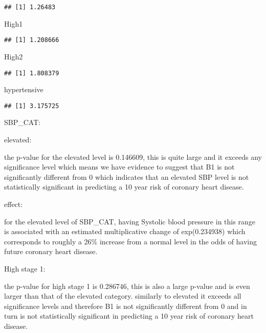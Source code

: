 \documentclass[
]{article}
\newenvironment{Shaded}{\begin{snugshade}}{\end{snugshade}}
\newcommand{\NormalTok}[1]{#1}
\begin{document}
\begin{verbatim}
## [1] 1.26483
\end{verbatim}

\begin{Shaded}
\begin{Highlighting}[]
\NormalTok{High1 }
\end{Highlighting}
\end{Shaded}

\begin{verbatim}
## [1] 1.208666
\end{verbatim}

\begin{Shaded}
\begin{Highlighting}[]
\NormalTok{High2 }
\end{Highlighting}
\end{Shaded}

\begin{verbatim}
## [1] 1.808379
\end{verbatim}

\begin{Shaded}
\begin{Highlighting}[]
\NormalTok{hypertensive}
\end{Highlighting}
\end{Shaded}

\begin{verbatim}
## [1] 3.175725
\end{verbatim}

SBP\_CAT:

elevated:

the p-value for the elevated level is 0.146609, this is quite large and
it exceeds any significance level which means we have evidence to
suggest that B1 is not significantly different from 0 which indicates
that an elevated SBP level is not statistically significant in
predicting a 10 year risk of coronary heart disease.

effect:

for the elevated level of SBP\_CAT, having Systolic blood pressure in
this range is associated with an estimated multiplicative change of
exp(0.234938) which corresponds to roughly a 26\% increase from a normal
level in the odds of having future coronary heart disease.

High stage 1:

the p-value for high stage 1 is 0.286746, this is also a large p-value
and is even larger than that of the elevated category. similarly to
elevated it exceeds all significance levels and therefore B1 is not
significantly different from 0 and in turn is not statistically
significant in predicting a 10 year risk of coronary heart disease.
\end{document}
